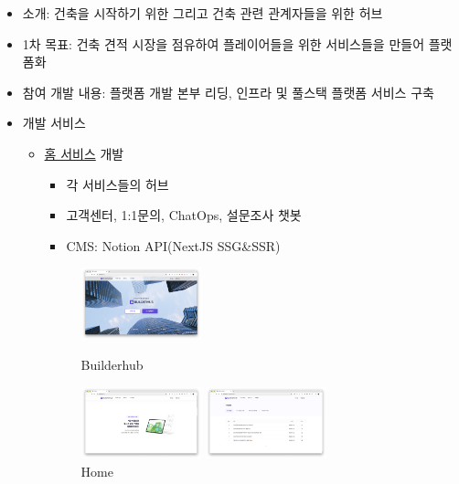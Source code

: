 
\begin{itemize}
	\item 소개: 건축을 시작하기 위한 그리고 건축 관련 관계자들을 위한 허브
	\item 1차 목표: 건축 견적 시장을 점유하여 플레이어들을 위한 서비스들을 만들어 플랫폼화
	\item 참여 개발 내용: 플랫폼 개발 본부 리딩, 인프라 및 풀스택 플랫폼 서비스 구축
	\item 개발 서비스
	      \begin{itemize}[label=$\star$]
		      \item \href{https://builderhub.io}{홈 서비스} 개발
		            \begin{itemize}
			            \item 각 서비스들의 허브
			            \item 고객센터, 1:1문의, ChatOps, 설문조사 챗봇
			            \item CMS: Notion API(NextJS SSG\&SSR)
		            \end{itemize}
		            \begin{figure}[!ht]
			            \begin{fullwidth}
				            \parbox{0.35\textwidth}{
					            \centering
					            \includegraphics[width=0.35\textwidth]{images/builderhub-home-1.png}
					            \caption*{Builderhub}
				            }\qquad
				            \parbox{0.35\textwidth}{
					            \centering
					            \includegraphics[width=0.35\textwidth]{images/builderhub-home-2.png}
					            \caption*{Home}
				            }\qquad
				            \parbox{0.35\textwidth}{
					            \centering
					            \includegraphics[width=0.35\textwidth]{images/builderhub-home-cs-1.png}
}
\end{fullwidth}
\end{figure}
\end{itemize}
\end{itemize}
